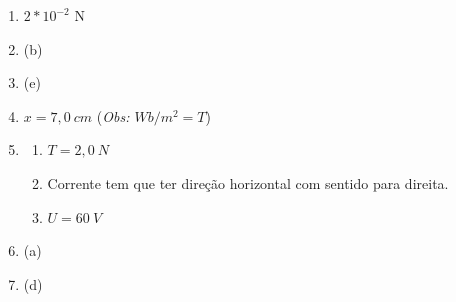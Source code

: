 \documentclass[12pt,letterpaper,fleqn]{article}
\begin{document}
\begin{itemize}
\begin{enumerate}
            \item $2*10^{-2}$ N
            \item (b)
            \item (e)
            \item $x=7,0\: cm$ (\textit{Obs: $Wb/m^2 = T$})
            \item \begin{enumerate}
                \item $T=2,0\:N$ 
                \item Corrente tem que ter direção horizontal com sentido para direita.
                \item $U=60\:V$
            \end{enumerate}
            \item (a)
            \item (d)
        \end{enumerate}
    \end{itemize}
\end{document}
